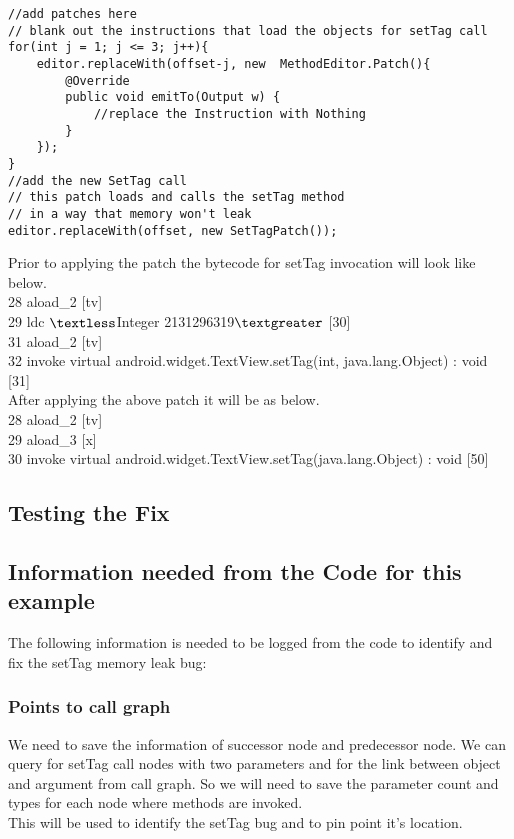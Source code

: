 \documentclass[11pt,psfig,a4]{article}
\begin{document}
\begin{flushleft}
\begin{lstlisting}
//add patches here
// blank out the instructions that load the objects for setTag call
for(int j = 1; j <= 3; j++){
	editor.replaceWith(offset-j, new  MethodEditor.Patch(){
		@Override
		public void emitTo(Output w) {
			//replace the Instruction with Nothing
		}
	});
}
//add the new SetTag call
// this patch loads and calls the setTag method
// in a way that memory won't leak
editor.replaceWith(offset, new SetTagPatch());
\end{lstlisting}
Prior to applying the patch the bytecode for setTag invocation will look like below.\\
\hspace{2em} 28  aload\_2 [tv]\\
\hspace{2em} 29  ldc $\textless$Integer 2131296319$\textgreater$ [30]\\
\hspace{2em} 31  aload\_2 [tv]\\
\hspace{2em} 32  invoke virtual android.widget.TextView.setTag(int, java.lang.Object) : void [31]\\
\vspace{0.5em}
After applying the above patch it will be as below.\\
\hspace{2em} 28  aload\_2 [tv]\\
\hspace{2em} 29  aload\_3 [x]\\
\hspace{2em} 30  invoke virtual android.widget.TextView.setTag(java.lang.Object) : void [50]\\
\subsection{Testing the Fix}
\subsection{Information needed from the Code for this example}
The following information is needed to be logged from the code to identify and fix the setTag memory leak bug:\\
\subsubsection{Points to call graph}
We need to save the information of successor node and predecessor node. We can query for setTag call nodes with two parameters and for the link between object and argument from call graph. So we will need to save the parameter count and types for each node where methods are invoked. \\
This will be used to identify the setTag bug and to pin point it's location.\\

\end{flushleft}
\end{document}

